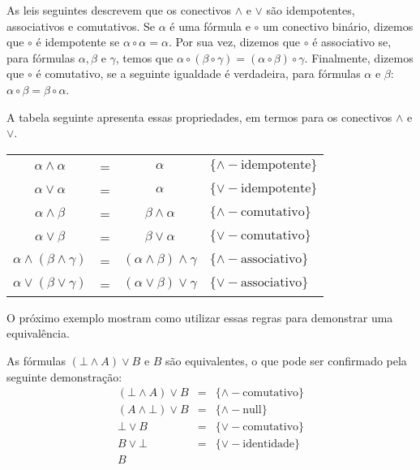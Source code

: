 As leis seguintes descrevem que os conectivos $\land$ e $\lor$ são
idempotentes, associativos e comutativos. Se $\alpha$ é uma fórmula e
$\circ$ um conectivo binário, dizemos que $\circ$ é idempotente se
$\alpha\circ \alpha = \alpha$. Por sua vez, dizemos que $\circ$ é
associativo se, para fórmulas $\alpha,\beta$ e $\gamma$, temos que
$\alpha \circ (\beta\circ \gamma) = (\alpha \circ \beta)\circ
\gamma$. Finalmente, dizemos que $\circ$ é comutativo, se a seguinte
igualdade é verdadeira, para fórmulas $\alpha$ e $\beta$: $\alpha
\circ \beta = \beta \circ \alpha$.

A tabela seguinte apresenta essas propriedades, em termos para os
conectivos $\land$ e $\lor$.

\begin{table}[h]
    \begin{tabular}{|cccl|}
         \hline
             $\alpha \land \alpha$ & = & $\alpha$ &
             $\{\land-\text{idempotente}\}$\\
             $\alpha \lor \alpha$ & = & $\alpha$ &
             $\{\lor-\text{idempotente}\}$\\
             $\alpha \land \beta$ & = & $\beta \land \alpha$ &
             $\{\land-\text{comutativo}\}$\\
             $\alpha \lor \beta$ & = & $\beta \lor \alpha$ &
             $\{\lor-\text{comutativo}\}$\\
             $\alpha\land(\beta\land\gamma)$ & =&  $(\alpha \land
             \beta)\land\gamma$ & $\{\land-\text{associativo}\}$\\
             $\alpha\lor(\beta\lor\gamma)$ & =&  $(\alpha \lor
             \beta)\lor\gamma$ & $\{\lor-\text{associativo}\}$\\
         \hline
    \end{tabular}
     \centering
\end{table}

O próximo exemplo mostram como utilizar essas regras para
demonstrar uma equivalência.

\begin{Example}
As fórmulas $(\bot \land A)\lor B$ e $B$ são equivalentes, o que pode
ser confirmado pela seguinte demonstração:
\[
\begin{array}{lcl}
(\bot\land A)\lor B & = & \{\land-\text{comutativo}\}\\
(A\land \bot)\lor B & = & \{\land-\text{null}\}\\
\bot \lor B & = & \{\lor-\text{comutativo}\}\\
B\lor \bot & = & \{\lor-\text{identidade}\}\\
B
\end{array}
\]
\end{Example}

